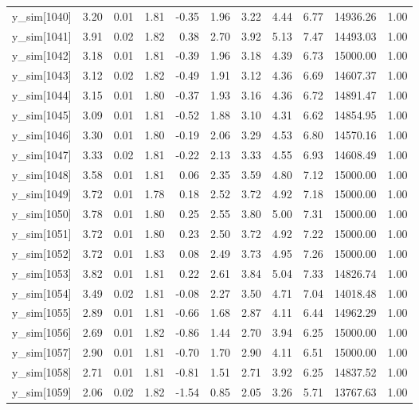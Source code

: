 \begin{table}[ht]
\begin{tabular}{rrrrrrrrrrr}
  y\_sim[1040] & 3.20 & 0.01 & 1.81 & -0.35 & 1.96 & 3.22 & 4.44 & 6.77 & 14936.26 & 1.00 \\ 
  y\_sim[1041] & 3.91 & 0.02 & 1.82 & 0.38 & 2.70 & 3.92 & 5.13 & 7.47 & 14493.03 & 1.00 \\ 
  y\_sim[1042] & 3.18 & 0.01 & 1.81 & -0.39 & 1.96 & 3.18 & 4.39 & 6.73 & 15000.00 & 1.00 \\ 
  y\_sim[1043] & 3.12 & 0.02 & 1.82 & -0.49 & 1.91 & 3.12 & 4.36 & 6.69 & 14607.37 & 1.00 \\ 
  y\_sim[1044] & 3.15 & 0.01 & 1.80 & -0.37 & 1.93 & 3.16 & 4.36 & 6.72 & 14891.47 & 1.00 \\ 
  y\_sim[1045] & 3.09 & 0.01 & 1.81 & -0.52 & 1.88 & 3.10 & 4.31 & 6.62 & 14854.95 & 1.00 \\ 
  y\_sim[1046] & 3.30 & 0.01 & 1.80 & -0.19 & 2.06 & 3.29 & 4.53 & 6.80 & 14570.16 & 1.00 \\ 
  y\_sim[1047] & 3.33 & 0.02 & 1.81 & -0.22 & 2.13 & 3.33 & 4.55 & 6.93 & 14608.49 & 1.00 \\ 
  y\_sim[1048] & 3.58 & 0.01 & 1.81 & 0.06 & 2.35 & 3.59 & 4.80 & 7.12 & 15000.00 & 1.00 \\ 
  y\_sim[1049] & 3.72 & 0.01 & 1.78 & 0.18 & 2.52 & 3.72 & 4.92 & 7.18 & 15000.00 & 1.00 \\ 
  y\_sim[1050] & 3.78 & 0.01 & 1.80 & 0.25 & 2.55 & 3.80 & 5.00 & 7.31 & 15000.00 & 1.00 \\ 
  y\_sim[1051] & 3.72 & 0.01 & 1.80 & 0.23 & 2.50 & 3.72 & 4.92 & 7.22 & 15000.00 & 1.00 \\ 
  y\_sim[1052] & 3.72 & 0.01 & 1.83 & 0.08 & 2.49 & 3.73 & 4.95 & 7.26 & 15000.00 & 1.00 \\ 
  y\_sim[1053] & 3.82 & 0.01 & 1.81 & 0.22 & 2.61 & 3.84 & 5.04 & 7.33 & 14826.74 & 1.00 \\ 
  y\_sim[1054] & 3.49 & 0.02 & 1.81 & -0.08 & 2.27 & 3.50 & 4.71 & 7.04 & 14018.48 & 1.00 \\ 
  y\_sim[1055] & 2.89 & 0.01 & 1.81 & -0.66 & 1.68 & 2.87 & 4.11 & 6.44 & 14962.29 & 1.00 \\ 
  y\_sim[1056] & 2.69 & 0.01 & 1.82 & -0.86 & 1.44 & 2.70 & 3.94 & 6.25 & 15000.00 & 1.00 \\ 
  y\_sim[1057] & 2.90 & 0.01 & 1.81 & -0.70 & 1.70 & 2.90 & 4.11 & 6.51 & 15000.00 & 1.00 \\ 
  y\_sim[1058] & 2.71 & 0.01 & 1.81 & -0.81 & 1.51 & 2.71 & 3.92 & 6.25 & 14837.52 & 1.00 \\ 
  y\_sim[1059] & 2.06 & 0.02 & 1.82 & -1.54 & 0.85 & 2.05 & 3.26 & 5.71 & 13767.63 & 1.00 \\ 

\end{tabular}
\end{table}
